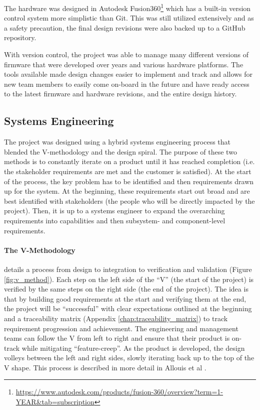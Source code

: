 The hardware was designed in Autodesk Fusion360\footnote{\url{https://www.autodesk.com/products/fusion-360/overview?term=1-YEAR&tab=subscription}} which has a built-in version control system more simplistic than Git.
This was still utilized extensively and as a safety precaution, the final design revisions were also backed up to a GitHub repository.

With version control, the project was able to manage many different versions of firmware that were developed over years and various hardware platforms.
The tools available made design changes easier to implement and track and allows for new team members to easily come on-board in the future and have ready access to the latest firmware and hardware revisions, and the entire design history.

\subsection{Systems Engineering}
The project was designed using a hybrid systems engineering process that blended the V-methodology and the design spiral.
The purpose of these two methods is to constantly iterate on a product until it has reached completion (i.e. the stakeholder requirements are met and the customer is satisfied).
At the start of the process, the key problem has to be identified and then requirements drawn up for the system.
At the beginning, these requirements start out broad and are best identified with stakeholders (the people who will be directly impacted by the project).
Then, it is up to a systems engineer to expand the overarching requirements into capabilities and then subsystem- and component-level requirements.

\paragraph*{The V-Methodology} details a process from design to integration to verification and validation (Figure \ref{fig:v_method}).
Each step on the left side of the ``V'' (the start of the project) is verified by the same steps on the right side (the end of the project).
The idea is that by building good requirements at the start and verifying them at the end, the project will be ``successful'' with clear expectations outlined at the beginning and a traceability matrix (Appendix \ref{chap:traceability_matrix}) to track requirement progression and achievement.
The engineering and management teams can follow the V from left to right and ensure that their product is on-track while mitigating ``feature-creep''.
As the product is developed, the design volleys between the left and right sides, slowly iterating back up to the top of the V shape.
This process is described in more detail in Allouis et al \cite{Allouis:2013}.

